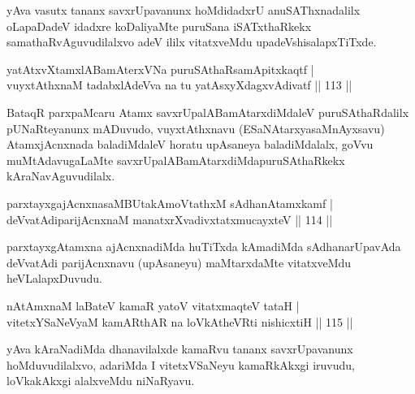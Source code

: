 \begin{artha}
yAva vasutx tananx savxrUpavanunx hoMdidadxrU anuSAThxnadalilx oLapaDadeV idadxre koDaliyaMte puruSana iSATxthaRkekx samathaRvAguvudilalxvo adeV ililx vitatxveMdu upadeVshisalapxTiTxde.
\end{artha}


\begin{shl}
yatAtxvXtamxlABamAterxVNa puruSAthaRsamApitxkaqtf |\\
vuyxtAthxnaM tadabxlAdeVva na tu yatAsxyXdagxvAdivatf \hfill || 113 ||
\end{shl}

\begin{artha}
BataqR parxpaMcaru Atamx savxrUpalABamAtarxdiMdaleV puruSAthaRdalilx pUNaRteyanunx mADuvudo, vuyxtAthxnavu (ESaNAtarxya\break saMnAyxsavu) AtamxjAcnxnada baladiMdaleV horatu upAsaneya baladiMdalalx, goVvu muMtAdavugaLaMte savxrUpalABamAtarxdiMda\break puruSAthaRkekx kAraNavAguvudilalx. 
\end{artha}%

\begin{shl}
parxtayxgajAcnxnasaMBUtakAmoVtathxM sAdhanAtamxkamf |\\
deVvatAdiparijAcnxnaM manatxrXvadivxtatxmucayxteV \hfill || 114 ||
\end{shl}

\begin{artha}
parxtayxgAtamxna ajAcnxnadiMda huTiTxda kAmadiMda sAdhanarUpavAda deVvatAdi parijAcnxnavu (upAsaneyu) maMtarxdaMte vitatxveMdu heVLalapxDuvudu.
\end{artha}

\begin{shl}
nA\s \s tAmxnaM laBateV kamaR yatoV vitatxmaqteV tataH |\\
vitetxYSaNeVyaM kamARthAR na loVkAtheVRti nishicxtiH \hfill || 115 ||
\end{shl}

\begin{artha}
yAva kAraNadiMda dhanavilalxde kamaRvu tananx savxrUpavanunx hoMduvudilalxvo, adariMda I vitetxVSaNeyu kamaRkAkxgi iruvudu, loVkakAkxgi alalxveMdu niNaRyavu.
\end{artha}



